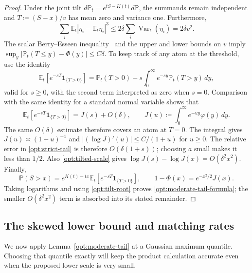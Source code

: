 \documentclass[11pt,letterpaper]{article}
\theoremstyle{remark}
\newcommand{\E}{\mathbb E}
\newcommand{\Pp}{\mathbb P}
\newcommand{\Var}{\operatorname{Var}}
\newcommand{\ind}{\mathbf 1}
\begin{document}
\begin{proof}
Under the joint tilt
\(d\Pp_t=e^{tS-K(t)}d\Pp\), the summands remain independent and
\(T\coloneqq(S-x)/v\) has mean zero and variance one. Furthermore,
\[
 \sum_i\E_t|\eta_i-\E_t\eta_i|^3
 \le2\delta\sum_i\Var_t(\eta_i)=2\delta v^2.
\]
The scalar Berry--Esseen inequality~\cite{Berry1941} and the upper and lower bounds on \(v\) imply
\(\sup_y|\Pp_t(T\le y)-\Phi(y)|\le C\delta\).
To keep track of any atom at the threshold, use the identity
\[
 \E_t[e^{-sT}\ind_{\{T>0\}}]
 =\Pp_t(T>0)-s\int_0^\infty e^{-sy}\Pp_t(T>y)\,dy,
\]
valid for \(s\ge0\), with the second term interpreted as zero when
\(s=0\). Comparison with
the same identity for a standard normal variable shows that
\begin{equation}
 \E_t[e^{-sT}\ind_{\{T>0\}}]=J(s)+O(\delta),\qquad
 J(u)\coloneqq\int_0^\infty e^{-uy}\varphi(y)\,dy.
 \label{opt:strict-tail}
\end{equation}
The same \(O(\delta)\) estimate therefore covers an atom at \(T=0\).
The integral gives \(J(u)\asymp(1+u)^{-1}\) and
\(|(\log J)'(u)|\le C/(1+u)\) for \(u\ge0\).
The relative error in \eqref{opt:strict-tail} is therefore
\(O(\delta(1+s))\); choosing \(a\) small makes it less than \(1/2\).
Also \eqref{opt:tilted-scale} gives
\(\log J(s)-\log J(x)=O(\delta^2x^2)\).
Finally,
\[
 \Pp(S>x)=e^{K(t)-tx}\E_t[e^{-sT}\ind_{\{T>0\}}],\qquad
 1-\Phi(x)=e^{-x^2/2}J(x).
\]
Taking logarithms and using \eqref{opt:tilt-root} proves
\eqref{opt:moderate-tail-formula}; the smaller
\(O(\delta^2x^2)\) term is absorbed into its stated remainder.
\end{proof}


\subsection{The skewed lower bound and matching rates}
\label{app:skew-proof}
We now apply Lemma~\ref{opt:moderate-tail} at a Gaussian maximum
quantile. Choosing that quantile exactly will keep the product
calculation accurate even when the proposed lower scale is very small.
\end{document}
